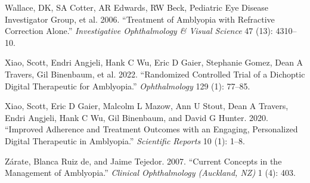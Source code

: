 \documentclass[
  letterpaper,
]{book}
\newlength{\cslhangindent}
\newlength{\cslentryspacingunit} %
\newenvironment{CSLReferences}[2] %
 {%
  \setlength{\parindent}{0pt}
  \ifodd #1
  \let\oldpar\par
  \def\par{\hangindent=\cslhangindent\oldpar}
  \fi
  \setlength{\parskip}{#2\cslentryspacingunit}
 }%
 {}
\begin{document}
\begin{CSLReferences}{1}{0}
\leavevmode{}%
Wallace, DK, SA Cotter, AR Edwards, RW Beck, Pediatric Eye Disease
Investigator Group, et al. 2006. {``Treatment of Amblyopia with
Refractive Correction Alone.''} \emph{Investigative Ophthalmology \&
Visual Science} 47 (13): 4310--10.

\leavevmode{}%
Xiao, Scott, Endri Angjeli, Hank C Wu, Eric D Gaier, Stephanie Gomez,
Dean A Travers, Gil Binenbaum, et al. 2022. {``Randomized Controlled
Trial of a Dichoptic Digital Therapeutic for Amblyopia.''}
\emph{Ophthalmology} 129 (1): 77--85.

\leavevmode{}%
Xiao, Scott, Eric D Gaier, Malcolm L Mazow, Ann U Stout, Dean A Travers,
Endri Angjeli, Hank C Wu, Gil Binenbaum, and David G Hunter. 2020.
{``Improved Adherence and Treatment Outcomes with an Engaging,
Personalized Digital Therapeutic in Amblyopia.''} \emph{Scientific
Reports} 10 (1): 1--8.

\leavevmode{}%
Zárate, Blanca Ruiz de, and Jaime Tejedor. 2007. {``Current Concepts in
the Management of Amblyopia.''} \emph{Clinical Ophthalmology (Auckland,
NZ)} 1 (4): 403.

\end{CSLReferences}


\backmatter
\end{document}
